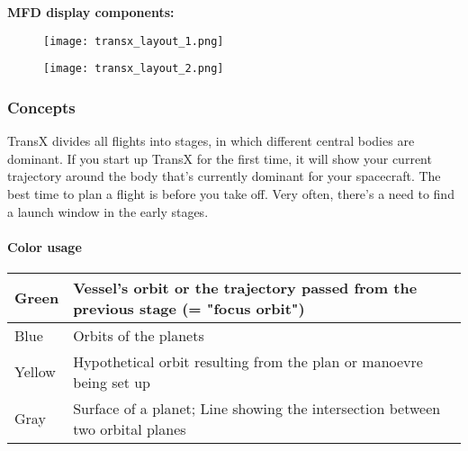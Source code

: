 \documentclass[Orbiter User Manual.tex]{subfiles}
\begin{document}
\noindent
\textbf{MFD display components:}

\begin{figure}[H]
  \centering
  \texttt{[image: transx\_layout\_1.png]}
\end{figure}

\begin{figure}[H]
  \centering
  \texttt{[image: transx\_layout\_2.png]}
\end{figure}


\noindent
\subsubsection{Concepts}
TransX divides all flights into stages, in which different central bodies are dominant. If you start up TransX for the first time, it will show your current trajectory around the body that's currently dominant for your spacecraft. The best time to plan a flight is before you take off. Very often, there's a need to find a launch window in the early stages.\\

\paragraph{Color usage}
	\begin{longtable}{ |p{}|p{}| }
	\hline\rule{0pt}{2ex}
	Green & Vessel's orbit or the trajectory passed from the previous stage (= "focus orbit")\\
	\hline\rule{0pt}{2ex}
	Blue & Orbits of the planets\\
	\hline\rule{0pt}{2ex}
	Yellow & Hypothetical orbit resulting from the plan or manoevre being set up\\
	\hline\rule{0pt}{2ex}
	Gray & Surface of a planet; Line showing the intersection between two orbital planes\\
	\hline
	\end{longtable}


\noindent
\end{document}

